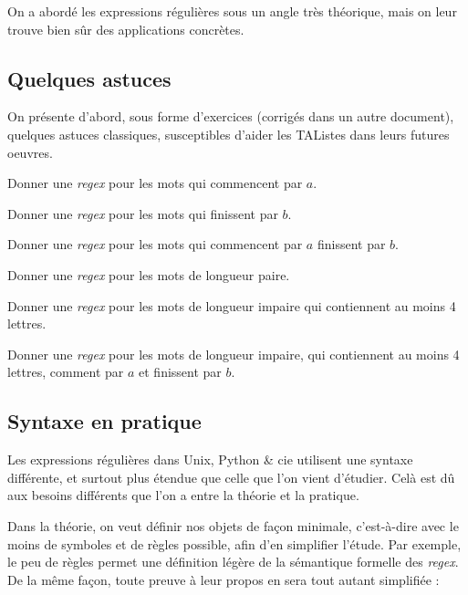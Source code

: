On a abordé les expressions régulières sous un angle très théorique, mais on leur trouve bien sûr des applications concrètes. 

\subsection{Quelques astuces}

On présente d'abord, sous forme d'exercices (corrigés dans un autre document), quelques astuces classiques, susceptibles d'aider les TAListes dans leurs futures oeuvres. 

\begin{exercice}
Donner une \textit{regex} pour les mots qui commencent par $a$.
\end{exercice}

\begin{exercice}
Donner une \textit{regex} pour les mots qui finissent par $b$.
\end{exercice}

\begin{exercice}
Donner une \textit{regex} pour les mots qui commencent par $a$ finissent par $b$.
\end{exercice}


\begin{exercice}
Donner une \textit{regex} pour les mots de longueur paire.
\end{exercice}

\begin{exercice}
Donner une \textit{regex} pour les mots de longueur impaire qui contiennent au moins 4 lettres.
\end{exercice}

\begin{exercice}
Donner une \textit{regex} pour les mots de longueur impaire, qui contiennent au moins 4 lettres, comment par $a$ et finissent par $b$.
\end{exercice}


\subsection{Syntaxe en pratique}

Les expressions régulières dans Unix, Python \& cie utilisent une syntaxe différente, et surtout plus étendue que celle que l'on vient d'étudier. Celà est dû aux besoins différents que l'on a entre la théorie et la pratique. 

Dans la théorie, on veut définir nos objets de façon minimale, c'est-à-dire avec le moins de symboles et de règles possible, afin d'en simplifier l'étude. Par exemple, le peu de règles permet une définition légère de la sémantique formelle des \textit{regex}. De la même façon, toute preuve à leur propos en sera tout autant simplifiée :

